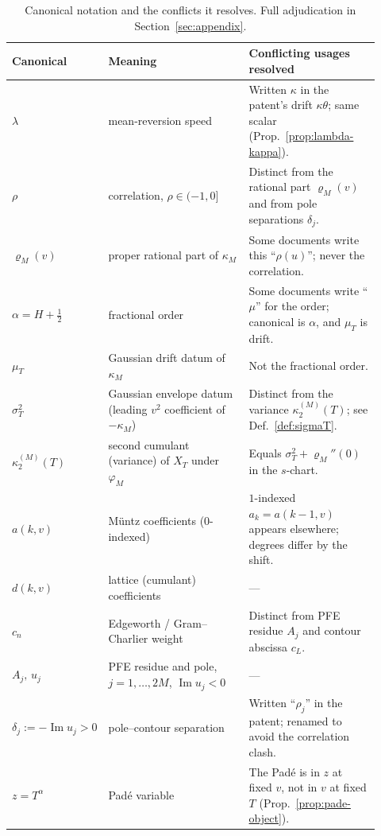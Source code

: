 \documentclass[11pt]{article}
\DeclareMathOperator{\Imag}{Im}
\theoremstyle{plain}
\theoremstyle{definition}
\theoremstyle{remark}
\begin{document}
\begin{table}[h]
\centering
\small
\begin{tabular}{@{}p{0.16\linewidth}p{0.40\linewidth}p{0.36\linewidth}@{}}
\hline
\textbf{Canonical} & \textbf{Meaning} & \textbf{Conflicting usages resolved} \\
\hline
$\lambda$ & mean-reversion speed & Written $\kappa$ in the patent's drift $\kappa\theta$; same scalar (Prop.~\ref{prop:lambda-kappa}). \\
$\rho$ & correlation, $\rho\in(-1,0]$ & Distinct from the rational part $\varrho_M(v)$ and from pole separations $\delta_j$. \\
$\varrho_M(v)$ & proper rational part of $\kappa_M$ & Some documents write this ``$\rho(u)$''; never the correlation. \\
$\alpha=H+\tfrac12$ & fractional order & Some documents write ``$\mu$'' for the order; canonical is $\alpha$, and $\mu_T$ is drift. \\
$\mu_T$ & Gaussian drift datum of $\kappa_M$ & Not the fractional order. \\
$\sigma_T^2$ & Gaussian envelope datum (leading $v^2$ coefficient of $-\kappa_M$) & Distinct from the variance $\kappa_2^{(M)}(T)$; see Def.~\ref{def:sigmaT}. \\
$\kappa_2^{(M)}(T)$ & second cumulant (variance) of $X_T$ under $\varphi_M$ & Equals $\sigma_T^2+\varrho_M''(0)$ in the $s$-chart. \\
$a(k,v)$ & Müntz coefficients ($0$-indexed) & $1$-indexed $a_k=a(k-1,v)$ appears elsewhere; degrees differ by the shift. \\
$d(k,v)$ & lattice (cumulant) coefficients & --- \\
$c_n$ & Edgeworth / Gram--Charlier weight & Distinct from PFE residue $A_j$ and contour abscissa $c_L$. \\
$A_j,\,u_j$ & PFE residue and pole, $j=1,\dots,2M$, $\Imag u_j<0$ & --- \\
$\delta_j:=-\Imag u_j>0$ & pole--contour separation & Written ``$\rho_j$'' in the patent; renamed to avoid the correlation clash. \\
$z=T^\alpha$ & Padé variable & The Padé is in $z$ at fixed $v$, not in $v$ at fixed $T$ (Prop.~\ref{prop:pade-object}). \\
\hline
\end{tabular}
\caption{Canonical notation and the conflicts it resolves. Full adjudication in
Section~\ref{sec:appendix}.}
\label{tab:notation}
\end{table}
\end{document}
